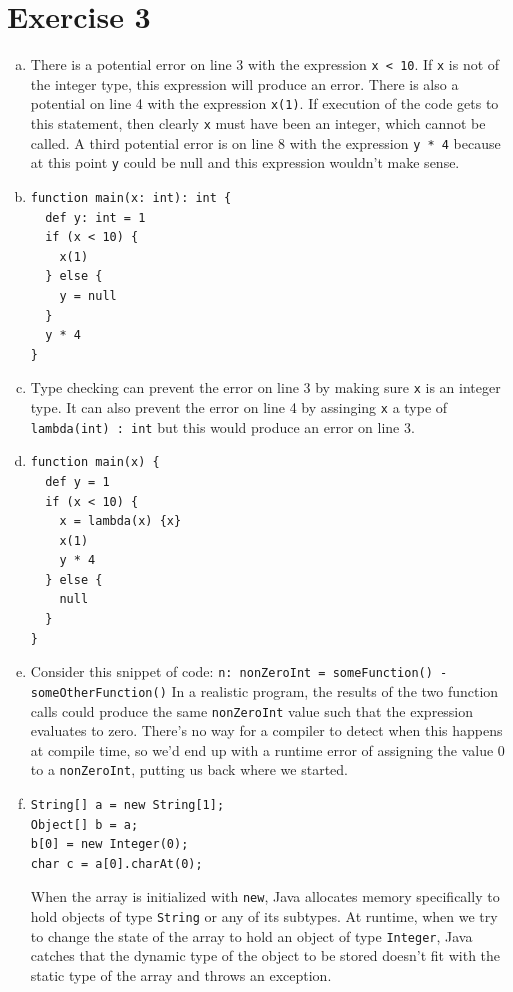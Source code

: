 \documentclass[11pt]{article}
\begin{document}
\section*{Exercise 3}
\begin{enumerate}[(a)]
\item There is a potential error on line 3 with the expression \texttt{x < 10}. If \texttt{x} is not of the integer type, this expression will produce an error. There is also a potential on line 4 with the expression \texttt{x(1)}. If execution of the code gets to this statement, then clearly \texttt{x} must have been an integer, which cannot be called. A third potential error is on line 8 with the expression \texttt{y * 4} because at this point \texttt{y} could be null and this expression wouldn't make sense.
\item \begin{verbatim}
function main(x: int): int {
  def y: int = 1
  if (x < 10) {
    x(1)
  } else {
    y = null
  }
  y * 4
}
\end{verbatim}
\item Type checking can prevent the error on line 3 by making sure \texttt{x} is an integer type. It can also prevent the error on line 4 by assinging \texttt{x} a type of \texttt{lambda(int) : int} but this would produce an error on line 3.
\item \begin{verbatim}
function main(x) {
  def y = 1
  if (x < 10) {
    x = lambda(x) {x}
    x(1)
    y * 4
  } else {
    null
  }
}
\end{verbatim}
\item Consider this snippet of code: \texttt{n: nonZeroInt = someFunction() - someOtherFunction()} In a realistic program, the results of the two function calls could produce the same \texttt{nonZeroInt} value such that the expression evaluates to zero. There's no way for a compiler to detect when this happens at compile time, so we'd end up with a runtime error of assigning the value 0 to a \texttt{nonZeroInt}, putting us back where we started.
\newpage
\item \begin{verbatim}
String[] a = new String[1];
Object[] b = a;
b[0] = new Integer(0);
char c = a[0].charAt(0);
\end{verbatim}
When the array is initialized with \texttt{new}, Java allocates memory specifically to hold objects of type \texttt{String} or any of its subtypes. At runtime, when we try to change the state of the array to hold an object of type \texttt{Integer}, Java catches that the dynamic type of the object to be stored doesn't fit with the static type of the array and throws an exception.
\end{enumerate}
\end{document}
